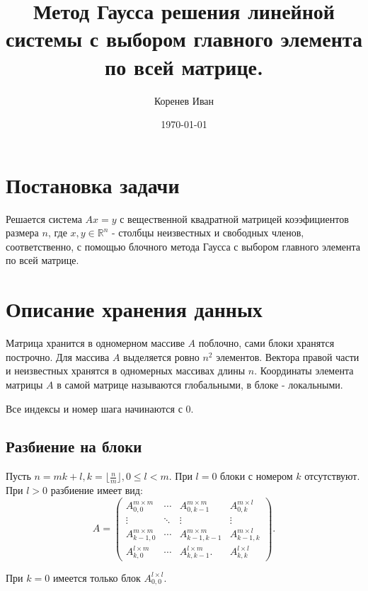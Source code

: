 \documentclass[a4paper,12pt]{article}
\begin{document}
\author{Коренев Иван}
\title{Метод Гаусса решения линейной системы с выбором главного элемента по всей матрице.}
\date{\today}
\maketitle



\section{Постановка задачи}
Решается система $Ax = y$ с вещественной квадратной матрицей коээфициентов размера $n$, где $x, y \in \mathbb{R}^n$ - столбцы неизвестных и свободных членов, соответственно, с помощью блочного метода Гаусса с выбором главного элемента по всей матрице.

\section{Описание хранения данных}
Матрица хранится в одномерном массиве $A$ поблочно, сами блоки хранятся построчно. Для массива $A$ выделяется ровно $n^2$ элементов. Вектора правой части и неизвестных хранятся в одномерных массивах длины $n$. Координаты элемента матрицы $A$ в самой матрице называются глобальными, в блоке - локальными.

Все индексы и номер шага начинаются с $0$.
\subsection{Разбиение на блоки}
Пусть $n = m k + l, k = \lfloor \frac{n}{m} \rfloor, 0 \leq l < m$. При $l = 0$ блоки с номером $k$ отсутствуют. При $l > 0$ разбиение имеет вид:
\[
    A =
    \begin{pmatrix}
        A_{0, 0}^{m \times m} & \cdots & A_{0, k - 1}^{m \times m} & A_{0, k}^{m \times l}     \\
        \vdots & \ddots & \vdots & \vdots                    \\
        A_{k - 1, 0}^{m \times m} & \cdots & A_{k - 1, k - 1}^{m \times m} & A_{k - 1, k}^{m \times l} \\
        A_{k, 0}^{l \times m} & \cdots & A_{k, k - 1}^{l \times m}. & A_{k, k}^{l \times l}
    \end{pmatrix}.
\]

При $k = 0$ имеется только блок $A_{0, 0}^{l \times l}$.
\end{document}
